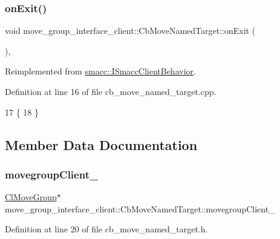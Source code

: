\subsubsection{\texorpdfstring{on\+Exit()}{onExit()}}
{\footnotesize\ttfamily void move\+\_\+group\+\_\+interface\+\_\+client\+::\+Cb\+Move\+Named\+Target\+::on\+Exit (\begin{DoxyParamCaption}{ }\end{DoxyParamCaption})\hspace{0.3cm}{\ttfamily [override]}, {\ttfamily [virtual]}}



Reimplemented from \hyperlink{classsmacc_1_1ISmaccClientBehavior_a36bf771905e3bf750909a15e4215a9b3}{smacc\+::\+I\+Smacc\+Client\+Behavior}.



Definition at line 16 of file cb\+\_\+move\+\_\+named\+\_\+target.\+cpp.


\begin{DoxyCode}
17 \{
18 \}
\end{DoxyCode}


\subsection{Member Data Documentation}
\mbox{\label{classmove__group__interface__client_1_1CbMoveNamedTarget_acd7b16a1c38b103c0624fad1dfd99176}} 
\subsubsection{\texorpdfstring{movegroup\+Client\+\_\+}{movegroupClient\_}}
{\footnotesize\ttfamily \hyperlink{classmove__group__interface__client_1_1ClMoveGroup}{Cl\+Move\+Group}$\ast$ move\+\_\+group\+\_\+interface\+\_\+client\+::\+Cb\+Move\+Named\+Target\+::movegroup\+Client\+\_\+\hspace{0.3cm}{\ttfamily [protected]}}



Definition at line 20 of file cb\+\_\+move\+\_\+named\+\_\+target.\+h.




